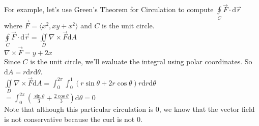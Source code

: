 \noindent
For example, let's use Green's Theorem for Circulation to compute $\oint\limits_{C}{\vec{F}\cdot\mathrm{d}\vec{r}}$ where $\vec{F}=\langle x^2, xy+x^2\rangle$ and $C$ is the unit circle.\\
\indent
$\oint\limits_{C}{\vec{F}\cdot\mathrm{d}\vec{r}}=\iint\limits_{D}{\nabla\times\vec{F}\mathrm{d}A}$\\
\indent
$\nabla\times\vec{F}=y+2x$\\
Since $C$ is the unit circle, we'll evaluate the integral using polar coordinates. So $\mathrm{d}A=r\mathrm{d}r\mathrm{d}\theta$.\\
$\iint\limits_{D}{\nabla\times\vec{F}\mathrm{d}A}=\int_{0}^{2\pi}{\int_{0}^{1}{(r\sin{\theta}+2r\cos{\theta})r\mathrm{d}r}\mathrm{d}\theta}$\\
\indent
$=\int_{0}^{2\pi}{\left(\frac{\sin{\theta}}{3}+\frac{2\cos{\theta}}{3}\right)\mathrm{d}\theta}=0$\\
\indent
Note that although this particular circulation is 0, we know that the vector field is not conservative because the curl is not 0.

